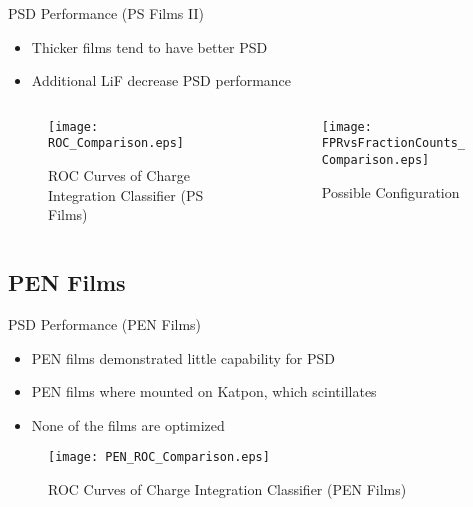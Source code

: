 \begin{frame}{PSD Performance (PS Films II)}
\small
\begin{itemize}
	\item Thicker films tend to have better PSD
	\item Additional LiF decrease PSD performance
\end{itemize}
\begin{columns}[onlytextwidth]
\begin{column}{0.45\textwidth}
	\tiny
	\begin{figure}
		\centering
		\texttt{[image: ROC\_Comparison.eps]}
		\caption{ROC Curves of Charge Integration Classifier (PS Films)}
	\end{figure}
\end{column}
\begin{column}{0.45\textwidth}
	\tiny
	\begin{figure}
		\centering
		\texttt{[image: FPRvsFractionCounts\_Comparison.eps]}
		\caption{Possible Configuration}
	\end{figure}
\end{column}
\end{columns}
\end{frame}
\subsection{PEN Films}
\begin{frame}{PSD Performance (PEN Films)}
\tiny
\begin{itemize}
	\item PEN films demonstrated little capability for PSD
	\item PEN films where mounted on Katpon, which scintillates
	\item None of the films are optimized \cite{zaitseva_plastic_2012}
\end{itemize}
	\begin{figure}
		\centering
		\texttt{[image: PEN\_ROC\_Comparison.eps]}
		\caption{ROC Curves of Charge Integration Classifier (PEN Films)}
	\end{figure}
\end{frame}
